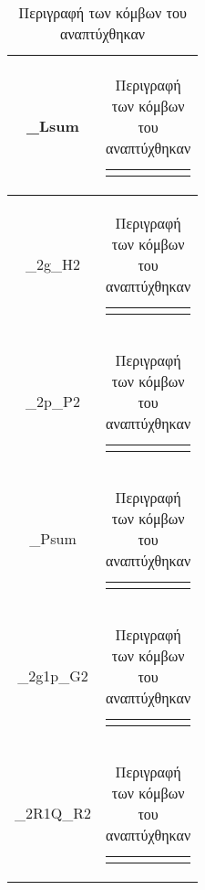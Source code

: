 \begin{appendices}
\begin{table}[H]
\begin{tabularx}{\textwidth}{ | c | X | }
    \_Lsum &
    \begin{tabular}{@{}c@{}}
        $sum = H\ ?\ x \oplus p\ :\ x$
    \end{tabular}\\\hline
    
    \_2g\_H2 &
    \begin{tabular}{@{}c@{}}
        $H = g_1 + g_0$
    \end{tabular}\\\hline
    
    \_2p\_P2 &
    \begin{tabular}{@{}c@{}}
        $P = p_1 p_0$
    \end{tabular}\\\hline
    
    \_Psum &
    \begin{tabular}{@{}c@{}}
        $sum = G \oplus x$
    \end{tabular}\\\hline
    
    \_2g1p\_G2 &
    \begin{tabular}{@{}c@{}}
        $G = g_1 + p*g_0$
    \end{tabular}\\\hline
    
    \_2R1Q\_R2 &
    \begin{tabular}{@{}c@{}}
        $R = R_1 + Q*R_0$
    \end{tabular}\\\hline
    
    
    \end{tabularx}
    \caption{Περιγραφή των κόμβων του αναπτύχθηκαν}
    \label{table:node_modules}
\end{table}














\end{appendices}
